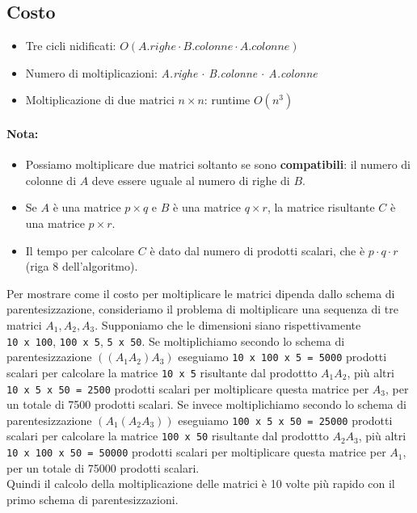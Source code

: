 \subsection{Costo}

\begin{itemize}
  \item Tre cicli nidificati: $O(A.righe \cdot B.colonne \cdot A.colonne)$
  \item Numero di moltiplicazioni: \emph{A.righe $\cdot$ B.colonne $\cdot$ A.colonne}
  \item Moltiplicazione di due matrici $n \times n$: runtime $O(n^3)$
\end{itemize}

\paragraph*{Nota:}
\begin{itemize}
  \item Possiamo moltiplicare due matrici soltanto se sono
        \textbf{compatibili}: il numero di colonne di $A$ deve essere uguale
        al numero di righe di $B$.
  \item Se $A$ è una matrice $p \times q$ e
        $B$ è una matrice $q \times r$, la matrice risultante $C$ è una
        matrice $p \times r$.
  \item Il tempo per calcolare $C$ è dato dal numero di prodotti scalari, che
        è $p \cdot q \cdot r$ (riga 8 dell'algoritmo).
\end{itemize}

Per mostrare come il costo per moltiplicare le matrici dipenda dallo
schema di parentesizzazione, consideriamo il problema di moltiplicare
una sequenza di tre matrici $A_1, A_2, A_3$. Supponiamo che le
dimensioni siano rispettivamente \texttt{10\ x\ 100},
\texttt{100\ x\ 5}, \texttt{5\ x\ 50}. Se moltiplichiamo secondo lo
schema di parentesizzazione $((A_1 A_2 )A_3)$ eseguiamo
\texttt{10\ x\ 100\ x\ 5\ =\ 5000} prodotti scalari per calcolare la
matrice \texttt{10\ x\ 5} risultante dal prodottto $A_1 A_2$, più
altri \texttt{10\ x\ 5\ x\ 50\ =\ 2500} prodotti scalari per
moltiplicare questa matrice per $A_3$, per un totale di 7500 prodotti
scalari. Se invece moltiplichiamo secondo lo schema di parentesizzazione
$(A_1 (A_2 A_3))$ eseguiamo \texttt{100\ x\ 5\ x\ 50\ =\ 25000}
prodotti scalari per calcolare la matrice \texttt{100\ x\ 50} risultante
dal prodottto $A_2 A_3$, più altri
\texttt{10\ x\ 100\ x\ 50\ =\ 50000} prodotti scalari per moltiplicare
questa matrice per $A_1$, per un totale di 75000 prodotti scalari.\\
Quindi il calcolo della moltiplicazione delle matrici è 10 volte più
rapido con il primo schema di parentesizzazioni.

